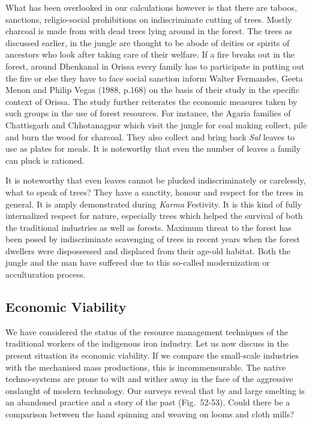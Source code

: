 What has been overlooked in our calculations however is that there are taboos, sanctions, religio-social prohibitions on indiscriminate cutting of trees. Mostly charcoal is made from with dead trees lying around in the forest. The trees as discussed earlier, in the jungle are thought to be abode of deities or spirits of ancestors who look after taking care of their welfare. If a fire breaks out in the forest, around Dhenkanal in Orissa every family has to participate in putting out the fire or else they have to face social sanction inform Walter Fermandes, Geeta Menon and Philip Vegas (1988, p.168) on the basis of their study in the specific context of Orissa. The study further reiterates the economic measures taken by such groups in the use of forest resources. For instance, the Agaria families of Chattisgarh and Chhotanagpur which visit the jungle for coal making collect, pile and burn the wood for charcoal. They also collect and bring back {\it Sal} leaves to use as plates for meals. It is noteworthy that even the number of leaves a family can pluck is rationed. 

It is noteworthy that even leaves cannot be plucked indiscriminately or carelessly, what to speak of trees? They have a sanctity, honour and respect for the trees in general. It is amply demonstrated during {\it Karma} Festivity. It is this kind of fully internalized respect for nature, especially trees which helped the survival of both the traditional industries as well as forests. Maximum threat to the forest has been posed by indiscriminate scavenging of trees in recent years when the forest dwellers were dispossessed and displaced from their age-old habitat. Both the jungle and the man have suffered due to this so-called modernization or acculturation process.

\vspace{-.3cm}

\subsection*{Economic Viability}\label{chapter7-subsection-7.1d}

\vspace{-.2cm}

We have considered the status of the resource management techniques of the traditional workers of the indigenous iron industry. Let us now discuss in the present situation its economic viability. If we compare the small-scale industries with the mechanised mass productions, this is incommensurable. The native techno-systems are prone to wilt and wither away in the face of the aggressive onslaught of modern technology. Our surveys reveal that by and large smelting is an abandoned practice and a story of the past (Fig.~52-53). Could there be a comparison between the hand spinning and weaving on looms and cloth mills?

